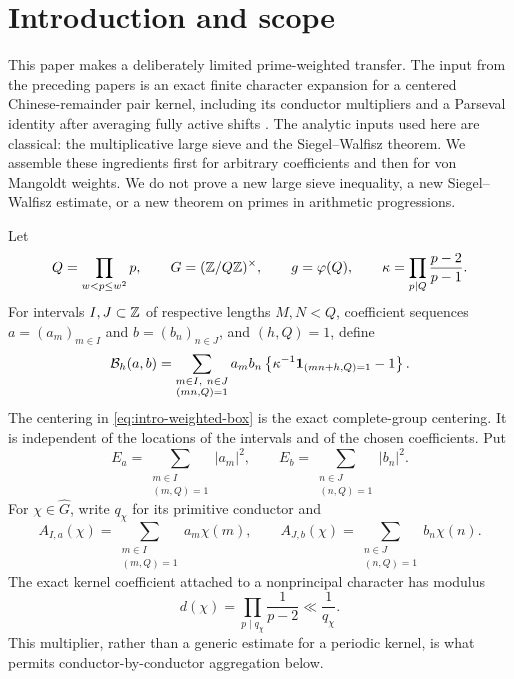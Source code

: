 \section{Introduction and scope}\label{sec:introduction}

This paper makes a deliberately limited prime-weighted transfer.  The input
from the preceding papers is an exact finite character expansion for a
centered Chinese-remainder pair kernel, including its conductor multipliers
and a Parseval identity after averaging fully active shifts
\citep{WangCenteredKernels2026,WangPowerShortRoughBoxes2026}.  The analytic
inputs used here are classical: the multiplicative large sieve and the
Siegel--Walfisz theorem.  We assemble these ingredients first for arbitrary
coefficients and then for von Mangoldt weights.  We do not prove a new large
sieve inequality, a new Siegel--Walfisz estimate, or a new theorem on primes
in arithmetic progressions.

Let
\begin{equation}\label{eq:intro-Q-G-kappa}
 Q=\prod_{w<p\le w^2}p,
 \qquad
 G=(\mathbb Z/Q\mathbb Z)^\times,
 \qquad
 g=\varphi(Q),
 \qquad
 \kappa=\prod_{p\mid Q}\frac{p-2}{p-1}.
\end{equation}
For intervals $I,J\subset\mathbb Z$ of respective lengths $M,N<Q$, coefficient
sequences $a=(a_m)_{m\in I}$ and $b=(b_n)_{n\in J}$, and $(h,Q)=1$, define
\begin{equation}\label{eq:intro-weighted-box}
 \mathcal B_h(a,b)
 =\sum_{\substack{m\in I,\ n\in J\\(mn,Q)=1}}
 a_m b_n
 \left\{
  \kappa^{-1}\mathbf 1_{(mn+h,Q)=1}-1
 \right\}.
\end{equation}
The centering in \eqref{eq:intro-weighted-box} is the exact complete-group
centering.  It is independent of the locations of the intervals and of the
chosen coefficients.  Put
\begin{equation}\label{eq:intro-coefficient-energies}
 E_a=\sum_{\substack{m\in I\\(m,Q)=1}}|a_m|^2,
 \qquad
 E_b=\sum_{\substack{n\in J\\(n,Q)=1}}|b_n|^2.
\end{equation}
For $\chi\in\widehat G$, write $q_\chi$ for its primitive conductor and
\begin{equation}\label{eq:intro-weighted-transforms}
 A_{I,a}(\chi)
 =\sum_{\substack{m\in I\\(m,Q)=1}}a_m\chi(m),
 \qquad
 A_{J,b}(\chi)
 =\sum_{\substack{n\in J\\(n,Q)=1}}b_n\chi(n).
\end{equation}
The exact kernel coefficient attached to a nonprincipal character has
modulus
\begin{equation}\label{eq:intro-conductor-multiplier}
 d(\chi)=\prod_{p\mid q_\chi}\frac1{p-2}
 \ll \frac1{q_\chi}.
\end{equation}
This multiplier, rather than a generic estimate for a periodic kernel, is
what permits conductor-by-conductor aggregation below.

